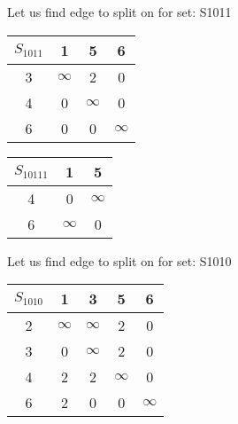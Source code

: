 \documentclass[a4paper,10pt]{report} %
\begin{document}
\newpage


Let us find edge to split on for set: S1011\\
\begin{flushleft}\begin{tabular}[]{|c|c|c|c|}
\hline
$S_{1011 }$& 1 & 5 & 6\\
\hline
3 & $\infty$ &      2 &      0\\
\hline
4 &      0 & $\infty$ &      0\\
\hline
6 &      0 &      0 & $\infty$\\
\hline
\end{tabular}
\end{flushleft}


\begin{table}[ht]
\hfill
{}
\end{table}


\begin{tabular}[]{|c|c|c|}
\hline
$S_{10111 }$& 1 & 5\\
\hline
4 &      0 & $\infty$\\
\hline
6 & $\infty$ &      0\\
\hline
\end{tabular}
\newpage

Let us find edge to split on for set: S1010\\
\begin{flushleft}\begin{tabular}[]{|c|c|c|c|c|}
\hline
$S_{1010 }$& 1 & 3 & 5 & 6\\
\hline
2 & $\infty$ & $\infty$ &      2 &      0\\
\hline
3 &      0 & $\infty$ &      2 &      0\\
\hline
4 &      2 &      2 & $\infty$ &      0\\
\hline
6 &      2 &      0 &      0 & $\infty$\\
\hline
\end{tabular}
\end{flushleft}
\end{document}
